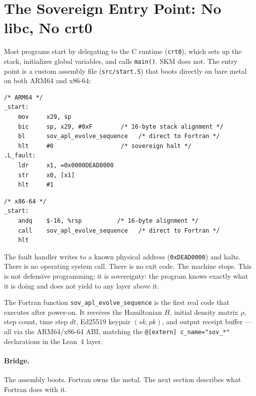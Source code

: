 \documentclass[11pt,a4paper]{article}
\begin{document}
\section{The Sovereign Entry Point: No libc, No crt0}

Most programs start by delegating to the C runtime (\texttt{crt0}), which
sets up the stack, initializes global variables, and calls \texttt{main()}.
SKM does not. The entry point is a custom assembly file (\texttt{src/start.S})
that boots directly on bare metal on both ARM64 and x86-64:

\begin{lstlisting}[language={}]
/* ARM64 */
_start:
    mov     x29, sp
    bic     sp, x29, #0xF        /* 16-byte stack alignment */
    bl      sov_apl_evolve_sequence   /* direct to Fortran */
    hlt     #0                   /* sovereign halt */
.L_fault:
    ldr     x1, =0x0000DEAD0000
    str     x0, [x1]
    hlt     #1
\end{lstlisting}

\begin{lstlisting}[language={}]
/* x86-64 */
_start:
    andq    $-16, %rsp          /* 16-byte alignment */
    call    sov_apl_evolve_sequence   /* direct to Fortran */
    hlt
\end{lstlisting}

The fault handler writes to a known physical address (\texttt{0xDEAD0000})
and halts. There is no operating system call. There is no exit code. The
machine stops. This is not defensive programming; it is sovereignty: the
program knows exactly what it is doing and does not yield to any layer
above it.

The Fortran function \texttt{sov\_apl\_evolve\_sequence} is the first
real code that executes after power-on. It receives the Hamiltonian $H$,
initial density matrix $\rho$, step count, time step $dt$, Ed25519
keypair $(sk, pk)$, and output receipt buffer --- all via the ARM64/x86-64
ABI, matching the \texttt{@[extern] c\_name="sov\_*"} declarations in
the Lean~4 layer.

\paragraph{Bridge.} The assembly boots. Fortran owns the metal.
The next section describes what Fortran does with it.

\end{document}
